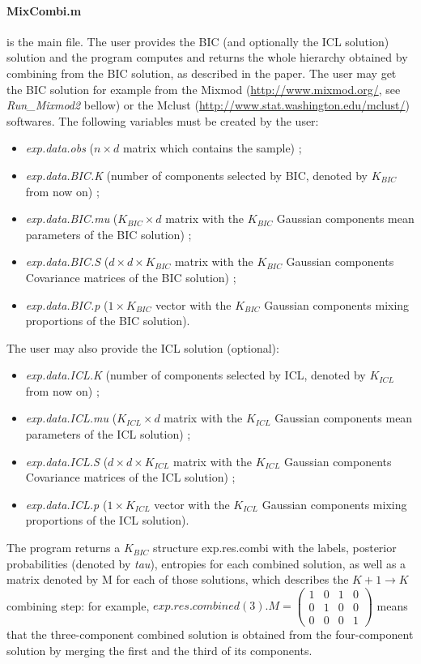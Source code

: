 \documentclass[12pt]{article}
\begin{document}
\paragraph{MixCombi.m}is the main file. The user provides the BIC (and optionally the ICL solution) solution and the program computes and returns the whole hierarchy obtained by combining from the BIC solution, as described in the paper. The user may get the BIC solution for example from the Mixmod (\url{http://www.mixmod.org/}, see {\it Run\_Mixmod2} bellow) or the Mclust (\url{http://www.stat.washington.edu/mclust/}) softwares. The following variables must be created by the user:
\begin{itemize}
\item {\it exp.data.obs} ($n\times d$ matrix which contains the sample) ;
\item {\it exp.data.BIC.K} (number of components selected by BIC, denoted by $K_{BIC}$ from now on) ;
\item {\it exp.data.BIC.mu} ($K_{BIC}\times d$ matrix with the $K_{BIC}$ Gaussian components mean parameters of the BIC solution) ;
\item {\it exp.data.BIC.S} ($d\times d\times K_{BIC}$ matrix with the $K_{BIC}$ Gaussian components Covariance matrices of the BIC solution) ;
\item {\it exp.data.BIC.p} ($1\times K_{BIC}$ vector with the $K_{BIC}$ Gaussian components mixing proportions of the BIC solution).
\end{itemize}
The user may also provide the ICL solution (optional):
\begin{itemize}
\item {\it exp.data.ICL.K} (number of components selected by ICL, denoted by $K_{ICL}$ from now on) ;
\item {\it exp.data.ICL.mu} ($K_{ICL}\times d$ matrix with the $K_{ICL}$ Gaussian components mean parameters of the ICL solution) ;
\item {\it exp.data.ICL.S} ($d\times d\times K_{ICL}$ matrix with the $K_{ICL}$ Gaussian components Covariance matrices of the ICL solution) ;
\item {\it exp.data.ICL.p} ($1\times K_{ICL}$ vector with the $K_{ICL}$ Gaussian components mixing proportions of the ICL solution).
\end{itemize}
The program returns a $K_{BIC}$ structure exp.res.combi with the labels, posterior probabilities (denoted by {\it tau}), entropies for each combined solution, as well as a matrix denoted by M for each of those solutions, which describes the $K+1\rightarrow K$ combining step: for example, $exp.res.combined(3).M=\begin{pmatrix}
1 & 0 & 1 & 0 \\
0 & 1 & 0 & 0 \\
0 & 0 & 0 & 1 
\end{pmatrix}$
means that the three-component combined solution is obtained from the four-component solution by merging the first and the third of its components.
\end{document}
